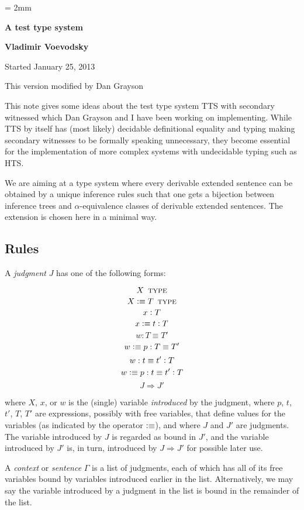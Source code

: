 \documentclass[11pt]{article}
\newcommand{\eqd}{\equiv}
\newcommand{\ccolon}[1]{\vcentcolon#1}
\newcommand{\Type}{\mathop{\text{ \sc type}}}
\newcommand{\defn}{\vcentcolon\equiv}
\begin{document}
\parskip = 2mm
\begin{center}
{\bf\Large A test type system}

{\bf Vladimir Voevodsky}

{Started January 25, 2013}  

{This version modified by Dan Grayson}  
\end{center}

\tableofcontents

This note gives some ideas about the test type system TTS with secondary
witnessed which Dan Grayson and I have been working on implementing. While TTS
by itself has (most likely) decidable definitional equality and typing making
secondary witnesses to be formally speaking unnecessary, they become essential
for the implementation of more complex systems with undecidable typing such as
HTS.

We are aiming at a type system where every derivable extended sentence can be
obtained by a unique inference rules such that one gets a bijection between
inference trees and $\alpha$-equivalence classes of derivable extended
sentences.  The extension is chosen here in a minimal way.

\subsection{Rules}

A {\em judgment} $J$ has one of the following forms:

$$ X \Type $$
$$ X \defn T \Type $$
$$ x \ccolon{T} $$
$$ x \defn t \ccolon{T} $$
$$ w : T \eqd T' $$
$$ w \defn p : T \eqd T' $$
$$ w : t \eqd t' \ccolon{T} $$
$$ w \defn p : t \eqd t' \ccolon{T} $$
$$ J \Rightarrow J' $$

where $X$, $x$, or $w$ is the (single) variable {\em introduced} by the
judgment, where $p$, $t$, $t'$, $T$, $T'$ are expressions, possibly with free
variables, that define values for the variables (as indicated by the operator
$\defn$), and where $J$ and $J'$ are judgments.  The variable introduced by $J$
is regarded as bound in $J'$, and the variable introduced by $J'$ is, in turn,
introduced by $ J \Rightarrow J' $ for possible later use.

A {\em context} or {\em sentence} $\Gamma$ is a list of judgments, each of
which has all of its free variables bound by variables introduced earlier in
the list.  Alternatively, we may say the variable introduced by a judgment in
the list is bound in the remainder of the list.
\end{document}
